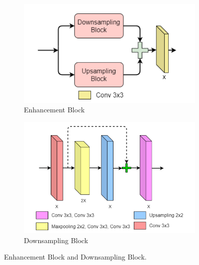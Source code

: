 \documentclass[letterpaper,10pt]{article}
\begin{document}
			\begin{figure}[htbp] 
				\centering 				
				\begin{subfigure}{0.4\textwidth}
					\includegraphics[width=\linewidth]{picture/LLIE/EdgeNet/Enhancement Block}
					\captionsetup{font=scriptsize}
					\caption{Enhancement Block}
					\label{fig: Enhancement Block}
				\end{subfigure}
				\begin{subfigure}{0.4\textwidth}
					\includegraphics[width=\linewidth]{picture/LLIE/EdgeNet/Downsampling Block}
					\captionsetup{font=scriptsize}
					\caption{Downsampling Block}
					\label{fig: Downsampling Block}
				\end{subfigure}
				\captionsetup{font=scriptsize}
				\caption{
					\label{fig: Enhancement Block and Downsampling Block}
					Enhancement Block and Downsampling Block.
				}
			\end{figure}
			
\end{document}
